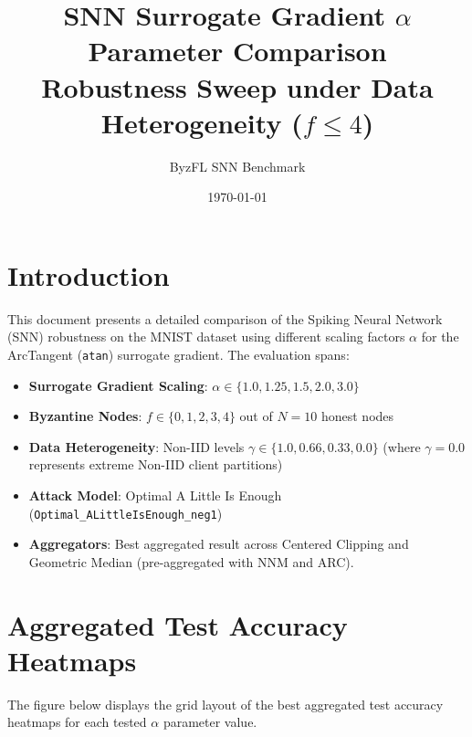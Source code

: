 \documentclass{article}
\title{SNN Surrogate Gradient $\alpha$ Parameter Comparison\\Robustness Sweep under Data Heterogeneity ($f \le 4$)}
\author{ByzFL SNN Benchmark}
\date{\today}
\begin{document}
\maketitle

\section{Introduction}
This document presents a detailed comparison of the Spiking Neural Network (SNN) robustness on the MNIST dataset using different scaling factors $\alpha$ for the ArcTangent (\texttt{atan}) surrogate gradient. The evaluation spans:
\begin{itemize}
    \item \textbf{Surrogate Gradient Scaling}: $\alpha \in \{1.0, 1.25, 1.5, 2.0, 3.0\}$
    \item \textbf{Byzantine Nodes}: $f \in \{0, 1, 2, 3, 4\}$ out of $N=10$ honest nodes
    \item \textbf{Data Heterogeneity}: Non-IID levels $\gamma \in \{1.0, 0.66, 0.33, 0.0\}$ (where $\gamma = 0.0$ represents extreme Non-IID client partitions)
    \item \textbf{Attack Model}: Optimal A Little Is Enough (\texttt{Optimal\_ALittleIsEnough\_neg1})
    \item \textbf{Aggregators}: Best aggregated result across Centered Clipping and Geometric Median (pre-aggregated with NNM and ARC).
\end{itemize}

\section{Aggregated Test Accuracy Heatmaps}
The figure below displays the grid layout of the best aggregated test accuracy heatmaps for each tested $\alpha$ parameter value.
\end{document}
